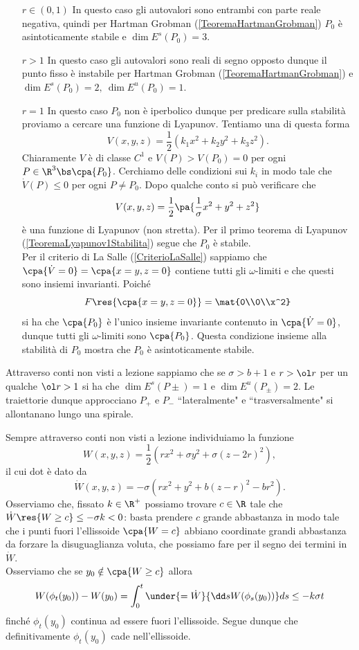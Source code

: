 \begin{itemize}
\item[$\boxed{r\in(0,1)}$] In questo caso gli autovalori sono entrambi con parte reale negativa, quindi per Hartman Grobman (\ref{TeoremaHartmanGrobman}) $P_0$ \`e asintoticamente stabile e $\dim E^s(P_0)=3$.
\item[$\boxed{r>1}$] In questo caso gli autovalori sono reali di segno opposto dunque il punto fisso \`e instabile per Hartman Grobman (\ref{TeoremaHartmanGrobman}) e $\dim E^s(P_0)=2,\ \dim E^u(P_0)=1$.
\item[$\boxed{r=1}$] In questo caso $P_0$ non \`e iperbolico dunque per predicare sulla stabilit\`a proviamo a cercare una funzione di Lyapunov. Tentiamo una di questa forma
\[V(x,y,z)=\frac12(k_1x^2+k_2y^2+k_3z^2).\]
Chiaramente $V$ \`e di classe $C^1$ e $V(P)>V(P_0)=0$ per ogni $P\in\R^3\bs\cpa{P_0}$. Cerchiamo delle condizioni sui $k_i$ in modo tale che $\dot V(P)\leq 0$ per ogni $P\neq P_0$. Dopo qualche conto si pu\`o verificare che
\[V(x,y,z)=\frac12\pa{\frac1\sigma x^2+y^2+z^2}\]
\`e una funzione di Lyapunov (non stretta). Per il primo teorema di Lyapunov (\ref{TeoremaLyapunov1Stabilita}) segue che $P_0$ \`e stabile.\\
Per il criterio di La Salle (\ref{CriterioLaSalle}) sappiamo che $\cpa{\dot V=0}=\cpa{x=y,z=0}$ contiene tutti gli $\omega$-limiti e che questi sono insiemi invarianti. Poich\'e
\[F\res{\cpa{x=y,z=0}}=\mat{0\\0\\x^2}\]
si ha che $\cpa{P_0}$ \`e l'unico insieme invariante contenuto in $\cpa{\dot V=0}$, dunque tutti gli $\omega$-limiti sono $\cpa{P_0}$. Questa condizione insieme alla stabilit\`a di $P_0$ mostra che $P_0$ \`e asintoticamente stabile.
\end{itemize}
\setlength{\leftmargini}{0.5cm}
Attraverso conti non visti a lezione sappiamo che se $\sigma>b+1$ e $r>\ol r$ per un qualche $\ol r>1$ si ha che $\dim E^s(P\pm)=1$ e $\dim E^u(P_\pm)=2$. Le traiettorie dunque approcciano $P_+$ e $P_-$ ``lateralmente" e ``trasversalmente" si allontanano lungo una spirale.

Sempre attraverso conti non visti a lezione individuiamo la funzione
\[W(x,y,z)=\frac12(rx^2+\sigma y^2+\sigma(z-2r)^2),\]
il cui dot \`e dato da
\[\dot W(x,y,z)=-\sigma(rx^2+y^2+b(z-r)^2-br^2).\]
Osserviamo che, fissato $k\in\R^+$ possiamo trovare $c\in\R$ tale che $\dot W\res{W\geq c}\leq -\sigma k<0$: basta prendere $c$ grande abbastanza in modo tale che i punti fuori l'ellissoide $\cpa{W=c}$ abbiano coordinate grandi abbastanza da forzare la disuguaglianza voluta, che possiamo fare per il segno dei termini in $\dot W$.\\
Osserviamo che se $y_0\notin \cpa{W\geq c}$ allora
\[W(\phi_t(y_0))-W(y_0)=\int_0^t\under{=\dot W}{\dd s{}W(\phi_s(y_0))}ds\leq -k\sigma t\]
finch\'e $\phi_t(y_0)$ continua ad essere fuori l'ellissoide. Segue dunque che definitivamente $\phi_t(y_0)$ cade nell'ellissoide.


